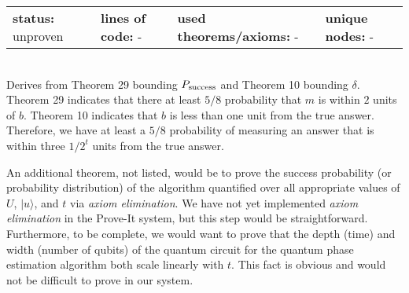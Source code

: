 \documentclass{article}[12pt]
\begin{document}
\begin{enumerate}
  \begin{tabular}{l | l | l | l}
    \textbf{status:} unproven & \textbf{lines of code:} - & \textbf{used theorems/axioms:} - & \textbf{unique nodes:} -            
  \end{tabular} \hfill \\
  Derives from Theorem 29 bounding $P_{\rm success}$ and Theorem 10 bounding $\delta$.  Theorem 29 indicates that there at least $5/8$ probability that $m$ is within $2$ units of $b$.  Theorem 10 indicates that $b$ is less than one unit from the true answer.  Therefore, we have at least a $5/8$ probability of measuring an answer that is within three $1/2^t$ units from the true answer.
\end{enumerate}
An additional theorem, not listed, would be to prove the success probability (or probability distribution) of the algorithm quantified over all appropriate values of $U$, $\lvert u \rangle$, and $t$ via {\em axiom elimination}.  We have not yet implemented {\em axiom elimination} in the Prove-It system, but this step would be straightforward.  Furthermore, to be complete, we would want to prove that the depth (time) and width (number of qubits) of the quantum circuit for the quantum phase estimation algorithm both scale linearly with $t$.  This fact is obvious and would not be difficult to prove in our system.
\end{document}
